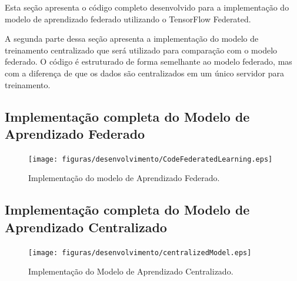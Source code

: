 Esta seção apresenta o código completo desenvolvido para a implementação do modelo de aprendizado federado utilizando o TensorFlow Federated.

A segunda parte dessa seção apresenta a implementação do modelo de treinamento centralizado que será utilizado para comparação com o modelo federado. O código é estruturado de forma semelhante ao modelo federado, mas com a diferença de que os dados são centralizados em um único servidor para treinamento.

\subsection{Implementação completa do Modelo de Aprendizado Federado}

\begin{figure}[ht]
    \centering
    \texttt{[image: figuras/desenvolvimento/CodeFederatedLearning.eps]}
    \caption{Implementação do modelo de Aprendizado Federado.}
    \label{fig:CodeFederatedLearning}
\end{figure}

\subsection{Implementação completa do Modelo de Aprendizado Centralizado}

\begin{figure}[ht]
    \centering
    \texttt{[image: figuras/desenvolvimento/centralizedModel.eps]}
    \caption{Implementação do Modelo de Aprendizado Centralizado.}
    \label{fig:centralizedModel}
\end{figure}